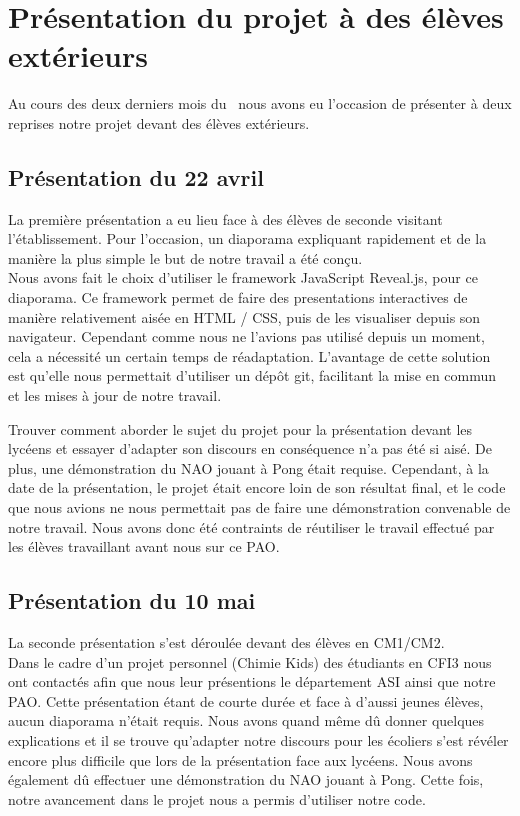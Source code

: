 \section{Présentation du projet à des élèves extérieurs}
\label{sec:Présentation du projet à des élèves extérieurs}
  \par Au cours des deux derniers mois du \pao\ nous avons eu l'occasion de présenter à deux reprises notre projet devant des élèves extérieurs.\\

  \subsection{Présentation du 22 avril}
  \label{sub:Présentation du 22 avril}
    \par La première présentation a eu lieu face à des élèves de seconde visitant l'établissement.
    Pour l'occasion, un diaporama expliquant rapidement et de la manière la plus simple le but de notre travail a été conçu.\\
    Nous avons fait le choix d'utiliser le framework JavaScript Reveal.js, pour ce diaporama.
    Ce framework permet de faire des presentations interactives de manière relativement aisée en HTML / CSS, puis de les visualiser depuis son navigateur.
    Cependant comme nous ne l’avions pas utilisé depuis un moment, cela a nécessité un certain temps de réadaptation.
    L'avantage de cette solution est qu'elle nous permettait d'utiliser un dépôt git, facilitant la mise en commun et les mises à jour de notre travail.\\
    \par Trouver comment aborder le sujet du projet pour la présentation devant les lycéens et essayer d’adapter son discours en conséquence n’a pas été si aisé.
    De plus, une démonstration du NAO jouant à Pong était requise.
    Cependant, à la date de la présentation, le projet était encore loin de son résultat final, et le code que nous avions ne nous permettait pas de faire une démonstration convenable de notre travail.
    Nous avons donc été contraints de réutiliser le travail effectué par les élèves travaillant avant nous sur ce PAO.\\

  \subsection{Présentation du 10 mai}
  \label{sub:Présentation du 10 mai}
    \par La seconde présentation s'est déroulée devant des élèves en CM1/CM2. \\
    Dans le cadre d'un projet personnel (Chimie Kids) des étudiants en CFI3 nous ont contactés afin que nous leur présentions le département ASI ainsi que notre PAO.
    Cette présentation étant de courte durée et face à d'aussi jeunes élèves, aucun diaporama n'était requis.
    Nous avons quand même dû donner quelques explications et il se trouve qu'adapter notre discours pour les écoliers s'est révéler encore plus difficile que lors de la présentation face aux lycéens.
    Nous avons également dû effectuer une démonstration du NAO jouant à Pong.
    Cette fois, notre avancement dans le projet nous a permis d'utiliser notre code.
\pagebreak
